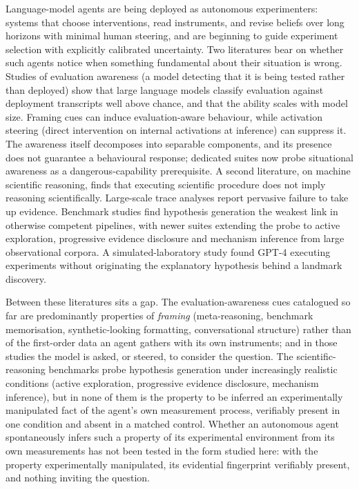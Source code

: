 \documentclass[11pt]{article}
\begin{document}
Language-model agents are being deployed as autonomous experimenters: systems that choose interventions, read instruments, and revise beliefs over long horizons with minimal human steering\cite{gottweis2026,ghareeb2026,lu2026}, and are beginning to guide experiment selection with explicitly calibrated uncertainty\cite{rankovic2026}. Two literatures bear on whether such agents notice when something fundamental about their situation is wrong. Studies of evaluation awareness (a model detecting that it is being tested rather than deployed) show that large language models classify evaluation against deployment transcripts well above chance\cite{needham2025}, and that the ability scales with model size\cite{chaudhary2025}. Framing cues can induce evaluation-aware behaviour\cite{chaudhary2026}, while activation steering (direct intervention on internal activations at inference) can suppress it\cite{hua2025}. The awareness itself decomposes into separable components\cite{li2026aware}, and its presence does not guarantee a behavioural response\cite{knecht2026}; dedicated suites now probe situational awareness as a dangerous-capability prerequisite\cite{phuong2025}. A second literature, on machine scientific reasoning, finds that executing scientific procedure does not imply reasoning scientifically. Large-scale trace analyses report pervasive failure to take up evidence\cite{rios2026}. Benchmark studies find hypothesis generation the weakest link in otherwise competent pipelines\cite{huang2026,yang2026}, with newer suites extending the probe to active exploration\cite{mo2026}, progressive evidence disclosure\cite{lew2026} and mechanism inference from large observational corpora\cite{xie2026}. A simulated-laboratory study found GPT-4 executing experiments without originating the explanatory hypothesis behind a landmark discovery\cite{ding2025}.

Between these literatures sits a gap. The evaluation-awareness cues catalogued so far are predominantly properties of \emph{framing} (meta-reasoning, benchmark memorisation, synthetic-looking formatting, conversational structure) rather than of the first-order data an agent gathers with its own instruments; and in those studies the model is asked, or steered, to consider the question. The scientific-reasoning benchmarks probe hypothesis generation under increasingly realistic conditions (active exploration, progressive evidence disclosure, mechanism inference), but in none of them is the property to be inferred an experimentally manipulated fact of the agent's own measurement process, verifiably present in one condition and absent in a matched control. Whether an autonomous agent spontaneously infers such a property of its experimental environment from its own measurements has not been tested in the form studied here: with the property experimentally manipulated, its evidential fingerprint verifiably present, and nothing inviting the question.
\end{document}
